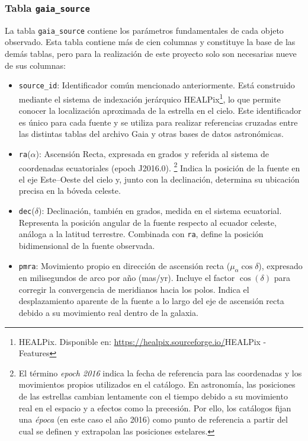 \subsubsection{Tabla \texttt{gaia\_source}}
La tabla \texttt{gaia\_source} contiene los parámetros fundamentales de cada objeto observado.
Esta tabla contiene más de cien columnas y constituye la base de las demás tablas, pero para la realización de este proyecto solo son necesarias nueve de sus columnas:
\begin{itemize}
    \item \texttt{source\_id}: Identificador común mencionado anteriormente.
    Está construido mediante el sistema de indexación jerárquico HEALPix\footnote{HEALPix. Disponible en: \url{https://healpix.sourceforge.io/}{HEALPix - Features}}, lo que permite conocer la localización aproximada de la estrella en el cielo.
    Este identificador es único para cada fuente y se utiliza para realizar referencias cruzadas entre las distintas tablas del archivo Gaia y otras bases de datos astronómicas.

    \item \texttt{ra}($\alpha$): Ascensión Recta, expresada en grados y referida al sistema de coordenadas ecuatoriales (epoch J2016.0).
    \footnote{El término \textit{epoch 2016} indica la fecha de referencia para las coordenadas y los movimientos propios utilizados en el catálogo. En astronomía, las posiciones de las estrellas cambian lentamente con el tiempo debido a su movimiento real en el espacio y a efectos como la precesión. Por ello, los catálogos fijan una \textit{época} (en este caso el año 2016) como punto de referencia a partir del cual se definen y extrapolan las posiciones estelares.}
    Indica la posición de la fuente en el eje Este–Oeste del cielo y, junto con la declinación, determina su ubicación precisa en la bóveda celeste.

    \item \texttt{dec}($\delta$): Declinación, también en grados, medida en el sistema ecuatorial.
    Representa la posición angular de la fuente respecto al ecuador celeste, análoga a la latitud terrestre.
    Combinada con \texttt{ra}, define la posición bidimensional de la fuente observada.

    \item \texttt{pmra}: Movimiento propio en dirección de ascensión recta ($\mu_{\alpha}\cos\delta$), expresado en milisegundos de arco por año (mas/yr).
    Incluye el factor $\cos(\delta)$ para corregir la convergencia de meridianos hacia los polos.
    Indica el desplazamiento aparente de la fuente a lo largo del eje de ascensión recta debido a su movimiento real dentro de la galaxia.


\end{itemize}
